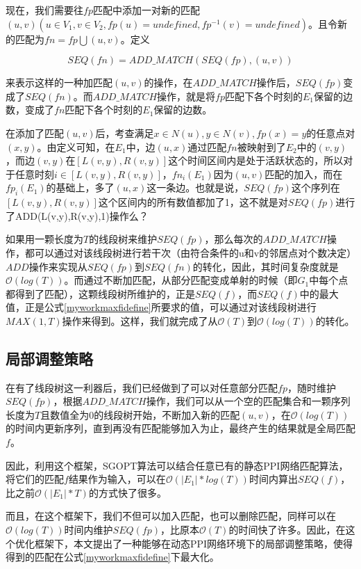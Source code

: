 现在，我们需要往$fp$匹配中添加一对新的匹配$(u,v)(u\in V_1,v\in V_2,fp(u)=undefined,fp^{-1}(v)=undefined)$。且令新的匹配为$fn=fp\bigcup (u,v)$。定义

\begin{equation}\label{myworkfadddefine}    
SEQ(fn)=ADD\_MATCH(SEQ(fp),(u,v))
\end{equation}

来表示这样的一种加匹配$(u,v)$的操作，在$ADD\_MATCH$操作后，$SEQ(fp)$变成了$SEQ(fn)$。而$ADD\_MATCH$操作，就是将$fp$匹配下各个时刻的$E_1$保留的边数，变成了$fn$匹配下各个时刻的$E_1$保留的边数。

在添加了匹配$(u,v)$后，考查满足$x\in N(u),y\in N(v),fp(x)=y$的任意点对$(x,y)$。由定义可知，在$E_1$中，边$(u,x)$通过匹配$fn$被映射到了$E_2$中的$(v,y)$，而边$(v,y)$在$[L(v,y),R(v,y)]$这个时间区间内是处于活跃状态的，所以对于任意时刻$i\in [L(v,y),R(v,y)]$，$fn_i(E_1)$因为$(u,v)$匹配的加入，而在$fp_i(E_1)$的基础上，多了$(u,x)$这一条边。也就是说，$SEQ(fp)$这个序列在$[L(v,y),R(v,y)]$这个区间内的所有数值都加了1，这不就是对$SEQ(fp)$进行了ADD(L(v,y),R(v,y),1)操作么？

如果用一颗长度为$T$的线段树来维护$SEQ(fp)$，那么每次的$ADD\_MATCH$操作，都可以通过对该线段树进行若干次（由符合条件的u和v的邻居点对个数决定）$ADD$操作来实现从$SEQ(fp)$到$SEQ(fn)$的转化，因此，其时间复杂度就是$\mathcal{O}(log(T))$。而通过不断加匹配，从部分匹配变成单射的时候（即$G_1$中每个点都得到了匹配），这颗线段树所维护的，正是$SEQ(f)$，而$SEQ(f)$中的最大值，正是公式\ref{myworkmaxfidefine}所要求的值，可以通过对该线段树进行$MAX(1,T)$操作来得到。这样，我们就完成了从$\mathcal{O}(T)$到$\mathcal{O}(log(T))$的转化。

\subsection{局部调整策略}
在有了线段树这一利器后，我们已经做到了可以对任意部分匹配$fp$，随时维护$SEQ(fp)$，根据$ADD\_MATCH$操作，我们可以从一个空的匹配集合和一颗序列长度为$T$且数值全为0的线段树开始，不断加入新的匹配$(u,v)$，在$\mathcal{O}(log(T))$的时间内更新序列，直到再没有匹配能够加入为止，最终产生的结果就是全局匹配$f$。

因此，利用这个框架，SGOPT算法可以结合任意已有的静态PPI网络匹配算法，将它们的匹配$f$结果作为输入，可以在$\mathcal{O}(|E_1|*log(T))$时间内算出$SEQ(f)$，比之前$\mathcal{O}(|E_1|*T)$的方式快了很多。

而且，在这个框架下，我们不但可以加入匹配，也可以删除匹配，同样可以在$\mathcal{O}(log(T))$时间内维护$SEQ(fp)$，比原本$\mathcal{O}(T)$的时间快了许多。因此，在这个优化框架下，本文提出了一种能够在动态PPI网络环境下的局部调整策略，使得得到的匹配在公式\ref{myworkmaxfidefine}下最大化。

